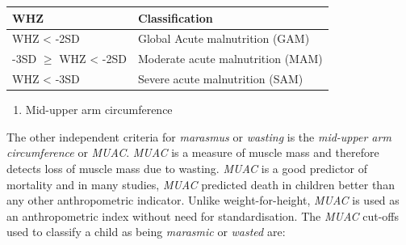 \documentclass[12pt,]{book}
\providecommand{\tightlist}{%
  \setlength{\itemsep}{0pt}\setlength{\parskip}{0pt}}
\theoremstyle{definition}
\theoremstyle{definition}
\theoremstyle{definition}
\theoremstyle{remark}
\begin{document}
\begin{longtable}[]{@{}ll@{}}
\toprule
\begin{minipage}[b]{0.34\columnwidth}\raggedright
\textbf{WHZ}\strut
\end{minipage} & \begin{minipage}[b]{0.47\columnwidth}\raggedright
\textbf{Classification}\strut
\end{minipage}\tabularnewline
\midrule
\endhead
\begin{minipage}[t]{0.34\columnwidth}\raggedright
WHZ \textless{} -2SD\strut
\end{minipage} & \begin{minipage}[t]{0.47\columnwidth}\raggedright
Global Acute malnutrition (GAM)\strut
\end{minipage}\tabularnewline
\begin{minipage}[t]{0.34\columnwidth}\raggedright
-3SD \(\geq\) WHZ \textless{} -2SD\strut
\end{minipage} & \begin{minipage}[t]{0.47\columnwidth}\raggedright
Moderate acute malnutrition (MAM)\strut
\end{minipage}\tabularnewline
\begin{minipage}[t]{0.34\columnwidth}\raggedright
WHZ \textless{} -3SD\strut
\end{minipage} & \begin{minipage}[t]{0.47\columnwidth}\raggedright
Severe acute malnutrition (SAM)\strut
\end{minipage}\tabularnewline
\bottomrule
\end{longtable}

\begin{enumerate}
\def\labelenumi{\arabic{enumi}.}
\setcounter{enumi}{1}
\tightlist
\item
  Mid-upper arm circumference
\end{enumerate}

The other independent criteria for \emph{marasmus} or \emph{wasting} is
the \emph{mid-upper arm circumference} or \emph{MUAC}. \emph{MUAC} is a
measure of muscle mass and therefore detects loss of muscle mass due to
wasting. \emph{MUAC} is a good predictor of mortality and in many
studies, \emph{MUAC} predicted death in children better than any other
anthropometric indicator. Unlike weight-for-height, \emph{MUAC} is used
as an anthropometric index without need for standardisation. The
\emph{MUAC} cut-offs used to classify a child as being \emph{marasmic}
or \emph{wasted} are:
\end{document}
